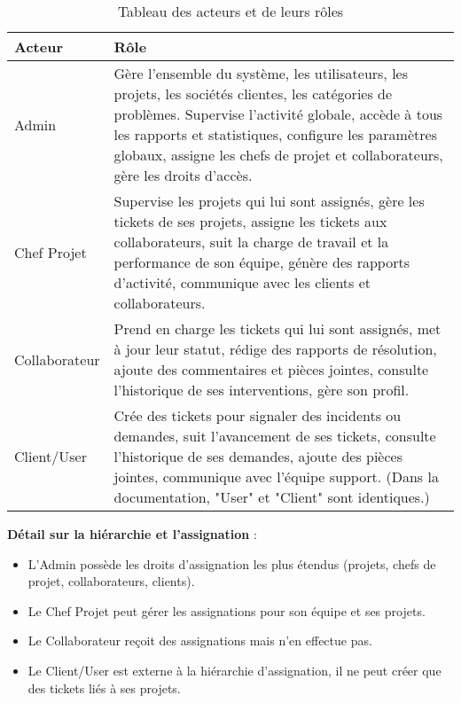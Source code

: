 \renewcommand{\arraystretch}{1.2}
\begin{table}[htbp]
    \centering
    \setlength{\tabcolsep}{6pt}
    \begin{tabular}{|p{2cm}|p{12cm}|}
        \hline
        \textbf{Acteur} & \textbf{Rôle} \\
        \hline
        Admin & Gère l'ensemble du système, les utilisateurs, les projets, les sociétés clientes, les catégories de problèmes. Supervise l'activité globale, accède à tous les rapports et statistiques, configure les paramètres globaux, assigne les chefs de projet et collaborateurs, gère les droits d'accès. \\
        \hline
        Chef Projet & Supervise les projets qui lui sont assignés, gère les tickets de ses projets, assigne les tickets aux collaborateurs, suit la charge de travail et la performance de son équipe, génère des rapports d'activité, communique avec les clients et collaborateurs. \\
        \hline
        Collaborateur & Prend en charge les tickets qui lui sont assignés, met à jour leur statut, rédige des rapports de résolution, ajoute des commentaires et pièces jointes, consulte l'historique de ses interventions, gère son profil. \\
        \hline
        Client/User & Crée des tickets pour signaler des incidents ou demandes, suit l'avancement de ses tickets, consulte l'historique de ses demandes, ajoute des pièces jointes, communique avec l'équipe support. (Dans la documentation, "User" et "Client" sont identiques.) \\
        \hline
    \end{tabular}
    \caption{Tableau des acteurs et de leurs rôles}
    \label{tab:tableau-acteurs}
\end{table}
\renewcommand{\arraystretch}{1}

\vspace{5mm} %

\textbf{Détail sur la hiérarchie et l'assignation} :
\begin{itemize}
    \item L'Admin possède les droits d'assignation les plus étendus (projets, chefs de projet, collaborateurs, clients).
    \item Le Chef Projet peut gérer les assignations pour son équipe et ses projets.
    \item Le Collaborateur reçoit des assignations mais n'en effectue pas.
    \item Le Client/User est externe à la hiérarchie d'assignation, il ne peut créer que des tickets liés à ses projets.
\end{itemize}

